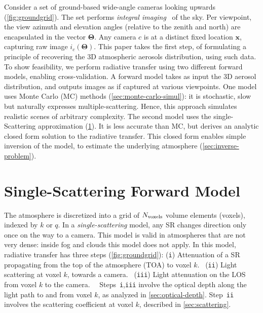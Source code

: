 \documentclass[10pt,letterpaper]{article}
\begin{document}
Consider a set of ground-based wide-angle cameras
looking upwards (\cref{fig:groundgrid}). The set performs {\em integral imaging}~\cite{integral} of the sky. Per viewpoint, the view azimuth and elevation angles (relative to the zenith and north) are
encapsulated in the vector ${\bm{\Theta}}$. Any camera $c$ is at a distinct fixed location ${\bm x}$, capturing raw image $i_c({\bm{\Theta}})$. This paper takes the first step, of formulating
a principle of recovering the 3D atmospheric aerosols distribution, using such data. To show feasibility, we perform radiative transfer using two different forward models, enabling cross-validation.
A forward model takes as input the 3D aerosol distribution, and outputs images as if
captured at various viewpoints. One model uses Monte Carlo (MC) methods (\cref{sec:monte-carlo-simul}): it is stochastic, slow but naturally expresses multiple-scattering. Hence, this approach simulates realistic
scenes of arbitrary complexity.  The second model uses the single-Scattering approximation
(\cref{sec:single-scatt-model}). It is less accurate than MC, but derives an analytic closed
form solution to the radiative transfer. This closed form enables simple inversion of
the model, to estimate the underlying atmosphere (\cref{sec:inverse-problem}).


\section{Single-Scattering Forward Model}
\label{sec:single-scatt-model}

The atmosphere is discretized into a grid of $N_{\rm voxels}$ volume
elements (voxels), indexed by $k$ or $q$. In a \emph{single-scattering} model,
any SR changes direction only once on the way to a camera. This
model is valid in atmospheres that are not very dense: inside fog and
clouds this model does not apply. In this model, radiative transfer has three steps
(\cref{fig:groundgrid}): ({\tt i}) Attenuation of a SR propagating from the top
  of the atmosphere (TOA) to voxel $k$. ~({\tt ii}) Light scattering at voxel $k$, towards a
  camera. ~({\tt iii}) Light attenuation on the LOS from voxel $k$ to
  the camera.~~
Steps~{\tt i},{\tt iii} involve the optical depth along the light path to and from voxel $k$, as analyzed in \cref{sec:optical-depth}.  Step~{\tt ii} involves the scattering coefficient at voxel $k$, described in
\cref{sec:scattering}.
\end{document}
